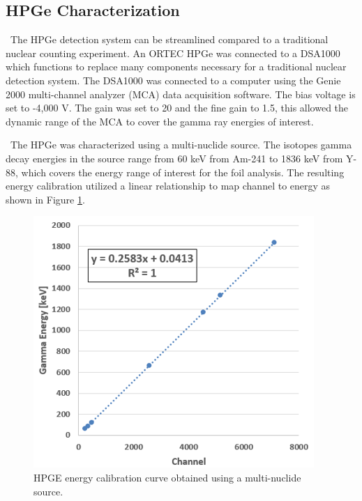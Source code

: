 \documentclass[journal]{IEEEtran}
\let\MYoriglatexcaption\caption
\renewcommand{\caption}[2][\relax]{\MYoriglatexcaption[#2]{#2}}
\begin{document}
{	\subsection{HPGe Characterization}
	
	\ The HPGe detection system can be streamlined compared to a traditional nuclear counting experiment. %
An ORTEC HPGe was connected to a DSA1000 which functions to replace many components necessary for a traditional nuclear detection system. 
The DSA1000 was connected to a computer using the Genie 2000 multi-channel analyzer (MCA) data acquisition software. 
The bias voltage is set to -4,000 V. %
The gain was set to 20 and the fine gain to 1.5, this allowed the dynamic range of the MCA to cover the gamma ray energies of interest. 
	
	\ The HPGe was characterized using a multi-nuclide source. 
The isotopes gamma decay energies in the source range from 60 keV from Am-241 to 1836 keV from Y-88, which covers the energy range of interest for the foil analysis. 
The resulting energy calibration utilized a linear relationship to map channel to energy as shown in Figure \ref{fig:ecal}. 
	
	\begin{figure}[h]
		\includegraphics[width=\linewidth]{Figures/ECal.png}
		\caption{HPGE energy calibration curve obtained using a multi-nuclide source.}
		\label{fig:ecal}
	\end{figure}
	
}
\end{document}
